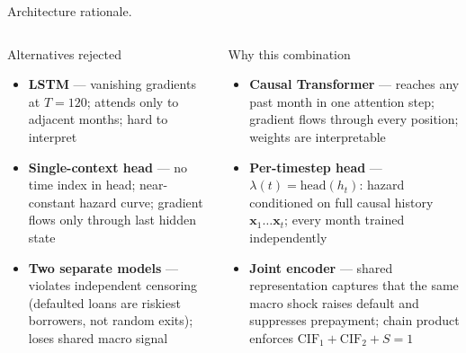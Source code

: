 \documentclass[10pt,aspectratio=169]{beamer}
\begin{document}
\begin{frame}{Architecture rationale.}
    \begin{columns}[T,onlytextwidth]
        \begin{alertblock}{Alternatives rejected}
        \small
        \begin{itemize}\itemsep4pt
            \item \textbf{LSTM} --- vanishing gradients at $T{=}120$; attends only to adjacent months; hard to interpret
            \item \textbf{Single-context head} --- no time index in head; near-constant hazard curve; gradient flows only through last hidden state
            \item \textbf{Two separate models} --- violates independent censoring (defaulted loans are riskiest borrowers, not random exits); loses shared macro signal
        \end{itemize}
        \end{alertblock}

        \begin{block}{Why this combination}
        \small
        \begin{itemize}\itemsep4pt
            \item \textbf{Causal Transformer} --- reaches any past month in one attention step; gradient flows through every position; weights are interpretable
            \item \textbf{Per-timestep head} --- $\lambda(t){=}\text{head}(h_t)$: hazard conditioned on full causal history $\mathbf{x}_1\!\dots\mathbf{x}_t$; every month trained independently
            \item \textbf{Joint encoder} --- shared representation captures that the same macro shock raises default and suppresses prepayment; chain product enforces $\text{CIF}_1{+}\text{CIF}_2{+}S{=}1$
        \end{itemize}
        \end{block}
    \end{columns}
\end{frame}
\end{document}
